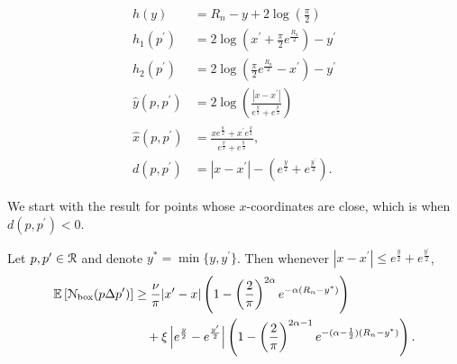 \begin{align}
	h(y) &= R_n - y + 2\log\left(\frac{\pi}{2}\right) \label{eq:def_height_y_P_n}\\
	h_1(p^\prime) &= 2\log\left(x^\prime + \frac{\pi}{2}e^{\frac{R_n}{2}}\right) - y^\prime \label{eq:def_height_left_P_n} \\
	h_2(p^\prime) &= 2\log\left(\frac{\pi}{2}e^{\frac{R_n}{2}} - x^\prime\right) - y^\prime 
		\label{eq:def_height_right_P_n} \\
	\hat{y}(p,p^\prime) &= 2\log\left(\frac{|x - x^\prime|}{e^{\frac{y}{2}} + e^{\frac{y^\prime}{2}}}\right)\\
	\hat{x}(p,p^\prime) &= \frac{x e^{\frac{y^\prime}{2}} + x^\prime e^{\frac{y}{2}}}{e^{\frac{y}{2}} + 	
		e^{\frac{y^\prime}{2}}},\\
	d(p,p^\prime) &= |x - x^\prime| - \left(e^{\frac{y}{2}} + e^{\frac{y^\prime}{2}}\right).
	\label{eq:def_d_p_p_prime}
\end{align}

We start with the result for points whose $x$-coordinates are close, which is when $d(p,p^\prime) < 0$.

\begin{lemma}\label{lem:disjoint_neighbors_P_n}
Let $p, p ^\prime \in {\mathcal R}$ and denote $y^\ast = \min\{y, y^\prime\}$. Then whenever $|x - x^\prime| \le e^{\frac{y}{2}} + e^{\frac{y^\prime}{2}}$,
\begin{align*}
	\mathbb{E}\left[{\mathcal N}_{\text{box}}(p \Delta p^\prime)\right]
	&\ge \frac{\nu}{\pi}|x^\prime - x|\left(1 - \left(\frac{2}{\pi}\right)^{2\alpha}e^{-\alpha(R_n - y^\ast)}\right)\\
	&\hspace{10pt}+ \xi\left|e^{\frac{y}{2}} - e^{\frac{y^\prime}{2}}\right|
		\left(1 - \left(\frac{2}{\pi}\right)^{2\alpha - 1}e^{-(\alpha - \frac{1}{2})(R_n-y^\ast)}\right).
\end{align*}
\end{lemma}

